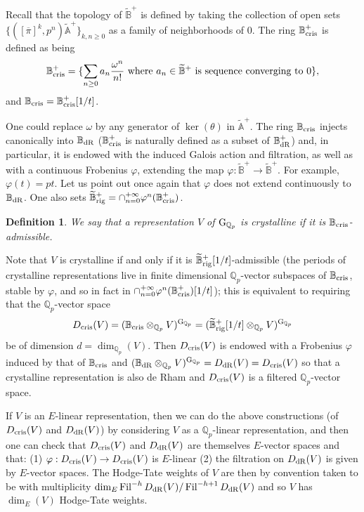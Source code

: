 \documentclass[11pt]{amsart}
\def\Q{{\mathbb Q}_p}
\def\g{{\rm G}_{\Q}}
\def\ra{\rightarrow}
\def\Qp{{\mathbb Q}_p}
\def\atplus{\widetilde{\mathbb{A}}^+}
\def\btplus{\widetilde{\mathbb{B}}^+}
\def\bcris{\mathbb{B}_{\rm cris}}
\def\bcontp{\widetilde{\mathbb{B}}^+_{\rm rig}}
\def\bdR{\mathbb{B}_{\rm dR}}
\def\dcris{D_{\rm cris}}
\def\ddR{D_{\rm dR}}
\def\on{\operatorname}
\newtheorem{definit}{\bf{Definition}}[subsection]
\begin{document}
Recall that the topology of $\btplus$  
is defined by taking the collection of open sets  
$\{ ([\overline{\pi}]^k,p^n)\atplus \}_{k,n \geq 0}$  
as a family of neighborhoods of $0$. 
The ring $\bcris^+$ is defined as being 
\[ \bcris^+= \{ \sum_{n \geq 0} a_n \frac{\omega^n}{n!} 
\text{ where $a_n\in \btplus$ is sequence converging to $0$} \}, \] 
and $\bcris=\bcris^+[1/t]$. 
 
One could replace  
$\omega$ by any generator of $\ker(\theta)$ in $\atplus$. The 
ring $\bcris$ injects canonically into $\bdR$  
($\bcris^+$ is naturally defined as a subset of $\bdR^+$) and,  
in particular, it is endowed with the induced 
Galois action and filtration, as well as  
with a continuous Frobenius $\varphi$, extending the 
map $\varphi: \btplus \ra \btplus$. For example, $\varphi(t)=pt$.  
Let us point out once again that 
$\varphi$ does not extend continuously  
to $\bdR$. One also sets $\bcontp=\cap_{n=0}^{+\infty} 
\varphi^n(\bcris^+)$. 
 
\begin{definit}\label{defcris} 
We say that a representation $V$  
of $\g$ is \emph{crystalline} if  
it is $\bcris$-admissible.  
\end{definit} 
 
Note that $V$ is crystalline if and only if 
it is $\bcontp[1/t]$-admissible  
(the periods of crystalline representations 
live in finite dimensional $\Q$-vector  
subspaces of $\bcris$, stable by $\varphi$, and so in fact 
in $\cap_{n=0}^{+\infty} 
\varphi^n(\bcris^+)[1/t]$); this is equivalent  
to requiring that the $\Q$-vector space 
\[ \dcris(V)=(\bcris \otimes_{\Qp} V)^{\g}=(\bcontp[1/t] 
\otimes_{\Qp} V)^{\g} \]  
be of dimension $d=\dim_{\Qp}(V)$.  
Then $\dcris(V)$ is endowed with a Frobenius $\varphi$  
induced by that of $\bcris$ 
and $(\bdR\otimes_{\Q} V)^{\g}=\ddR(V)= 
\dcris(V)$ so that a crystalline  
representation is also de Rham and $\dcris(V)$ is a 
filtered $\Qp$-vector space.  
 
If $V$ is an $E$-linear representation, then we can do the above 
constructions (of $\dcris(V)$ and $\ddR(V)$) by considering $V$ as a 
$\Qp$-linear representation, and then one can check that $\dcris(V)$ 
and $\ddR(V)$ are themselves $E$-vector spaces and that: (1) $\varphi: 
\dcris(V) \ra \dcris(V)$ is $E$-linear (2) the filtration on $\ddR(V)$ 
is given by $E$-vector spaces. The Hodge-Tate weights of $V$ are then 
by convention taken to be with multiplicity $\dim_E 
\on{Fil}^{-h} \ddR(V) /\on{Fil}^{-h+1} \ddR(V)$ and so $V$ has $\dim_E(V)$ 
Hodge-Tate weights.  
 
\end{document}
